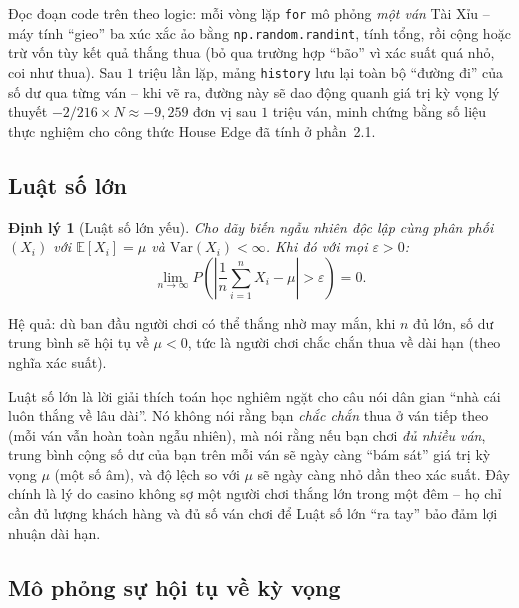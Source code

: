 \documentclass[12pt,a4paper]{article}
\theoremstyle{coloredthm}
\newtheorem{theorem}{Định lý}[section]
\theoremstyle{coloreddef}
\theoremstyle{remark}
\begin{document}
\begin{giaithich}
Đọc đoạn code trên theo logic: mỗi vòng lặp \texttt{for} mô phỏng \emph{một ván} Tài Xỉu -- máy tính ``gieo'' ba xúc xắc ảo bằng \texttt{np.random.randint}, tính tổng, rồi cộng hoặc trừ vốn tùy kết quả thắng thua (bỏ qua trường hợp ``bão'' vì xác suất quá nhỏ, coi như thua). Sau $1$ triệu lần lặp, mảng \texttt{history} lưu lại toàn bộ ``đường đi'' của số dư qua từng ván -- khi vẽ ra, đường này sẽ dao động quanh giá trị kỳ vọng lý thuyết $-2/216 \times N \approx -9{,}259$ đơn vị sau $1$ triệu ván, minh chứng bằng số liệu thực nghiệm cho công thức House Edge đã tính ở phần~2.1.
\end{giaithich}

\subsection{Luật số lớn}

\begin{theorem}[Luật số lớn yếu]
Cho dãy biến ngẫu nhiên độc lập cùng phân phối $(X_i)$ với $\mathbb{E}[X_i] = \mu$ và $\mathrm{Var}(X_i) < \infty$. Khi đó với mọi $\varepsilon > 0$:
\[
\lim_{n \to \infty} P\!\left(\left| \frac{1}{n}\sum_{i=1}^n X_i - \mu \right| > \varepsilon \right) = 0.
\]
\end{theorem}

Hệ quả: dù ban đầu người chơi có thể thắng nhờ may mắn, khi $n$ đủ lớn, số dư trung bình sẽ hội tụ về $\mu < 0$, tức là người chơi chắc chắn thua về dài hạn (theo nghĩa xác suất).

\begin{giaithich}
Luật số lớn là lời giải thích toán học nghiêm ngặt cho câu nói dân gian ``nhà cái luôn thắng về lâu dài''. Nó không nói rằng bạn \emph{chắc chắn} thua ở ván tiếp theo (mỗi ván vẫn hoàn toàn ngẫu nhiên), mà nói rằng nếu bạn chơi \emph{đủ nhiều ván}, trung bình cộng số dư của bạn trên mỗi ván sẽ ngày càng ``bám sát'' giá trị kỳ vọng $\mu$ (một số âm), và độ lệch so với $\mu$ sẽ ngày càng nhỏ dần theo xác suất. Đây chính là lý do casino không sợ một người chơi thắng lớn trong một đêm -- họ chỉ cần đủ lượng khách hàng và đủ số ván chơi để Luật số lớn ``ra tay'' bảo đảm lợi nhuận dài hạn.
\end{giaithich}

\subsection{Mô phỏng sự hội tụ về kỳ vọng}
\end{document}
